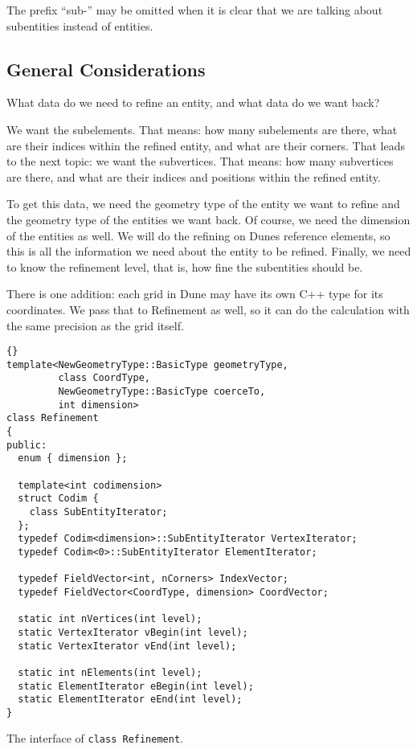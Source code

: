 \documentclass[english,a4paper]{article}
\newcommand{\code}[1]{\textnormal{\lstinline{#1}}}
\begin{document}
The prefix ``sub-'' may be omitted when it is clear that we are
talking about subentities instead of entities.

\subsection{General Considerations}

What data do we need to refine an entity, and what data do we want
back?

We want the subelements.  That means: how many subelements are
there, what are their indices within the refined entity, and what are
their corners.  That leads to the next topic: we want the subvertices.
That means: how many subvertices are there, and what are their indices
and positions within the refined entity.

To get this data, we need the geometry type of the entity we want to
refine and the geometry type of the entities we want back.  Of course,
we need the dimension of the entities as well.  We will do the
refining on Dunes reference elements, so this is all the information
we need about the entity to be refined.  Finally, we need to know the
refinement level, that is, how fine the subentities should be.

There is one addition: each grid in Dune may have its own C++ type for
its coordinates.  We pass that to Refinement as well, so it can do the
calculation with the same precision as the grid itself.

\begin{Listing}
  \begin{lstlisting}{}
template<NewGeometryType::BasicType geometryType,
         class CoordType,
         NewGeometryType::BasicType coerceTo,
         int dimension>
class Refinement
{
public:
  enum { dimension };

  template<int codimension>
  struct Codim {
    class SubEntityIterator;
  };
  typedef Codim<dimension>::SubEntityIterator VertexIterator;
  typedef Codim<0>::SubEntityIterator ElementIterator;

  typedef FieldVector<int, nCorners> IndexVector;
  typedef FieldVector<CoordType, dimension> CoordVector;

  static int nVertices(int level);
  static VertexIterator vBegin(int level);
  static VertexIterator vEnd(int level);

  static int nElements(int level);
  static ElementIterator eBegin(int level);
  static ElementIterator eEnd(int level);
}
  \end{lstlisting}
  \caption{The interface of \code{class Refinement}.}
  \label{intf_stat}
\end{Listing}
\end{document}
